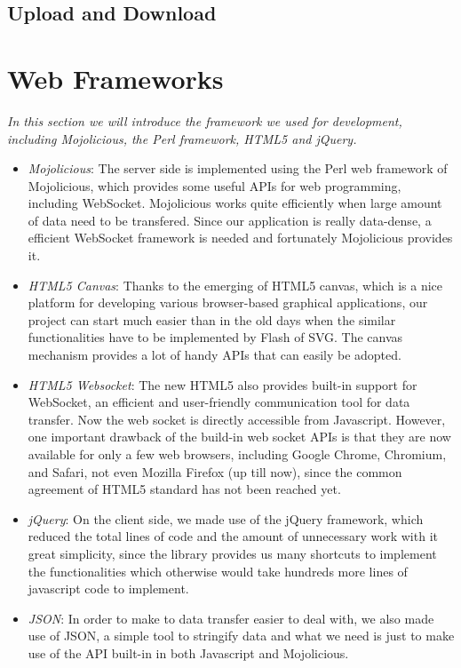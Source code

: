 \documentclass[a4paper,11pt,3p]{article}
\begin{document}
\subsection{Upload and Download}

\section{Web Frameworks}
\emph{In this section we will introduce the framework we used for development, 
including Mojolicious, the Perl framework, HTML5 and jQuery.}\\

\begin{itemize}
\item
\emph{Mojolicious}: The server side is implemented using the Perl web framework of Mojolicious,
which provides some useful APIs for web programming, including WebSocket.
Mojolicious works quite efficiently when large amount of data need to be
transfered. Since our application is really data-dense, a efficient WebSocket 
framework is needed and fortunately Mojolicious provides it.\\

\item
\emph{HTML5 Canvas}: Thanks to the emerging of HTML5 canvas, which is a nice platform for
developing various browser-based graphical applications, our project can start
much easier than in the old days when the similar functionalities have to be
implemented by Flash of SVG. The canvas mechanism provides a lot of handy APIs
that can easily be adopted.\\

\item
\emph{HTML5 Websocket}: The new HTML5 also provides built-in support for WebSocket, an
efficient and user-friendly communication tool for data transfer. Now the web
socket is directly accessible from Javascript. However, one important drawback
of the build-in web socket APIs is that they are now available for only a few
web browsers, including Google Chrome, Chromium, and Safari, not even
Mozilla Firefox (up till now), since the common agreement of HTML5 standard
has not been reached yet.\\

\item
\emph{jQuery}: On the client side, we made use of the jQuery framework, which 
reduced the total lines of code and the amount of unnecessary work with it great simplicity, 
since the library provides us many shortcuts to implement the functionalities which 
otherwise would take hundreds more lines of javascript code to implement.\\

\item
\emph{JSON}: In order to make to data transfer easier to deal with, we also made use of JSON, 
a simple tool to stringify data and what we need is just to make use of the API 
built-in in both Javascript and Mojolicious.\\
\end{itemize}
\end{document}
